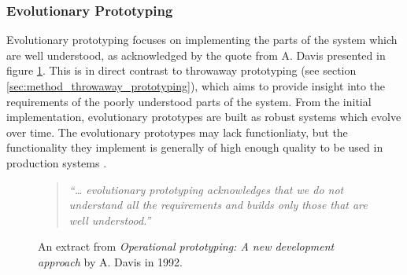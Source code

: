 
\subsubsection{Evolutionary Prototyping}
\label{sec:method_evolutionary_prototyping}

Evolutionary prototyping focuses on implementing the parts of the system which are well understood, as acknowledged by the quote from A. Davis presented in figure \ref{fig:evolutionary_prototyping}. This is in direct contrast to throwaway prototyping (see section \ref{sec:method_throwaway_prototyping}), which aims to provide insight into the requirements of the poorly understood parts of the system. From the initial implementation, evolutionary prototypes are built as robust systems which evolve over time. The evolutionary prototypes may lack functionliaty, but the functionality they implement is generally of high enough quality to be used in production systems \cite{operational_prototyping}.

\begin{figure}[htbp]
	\begin{quote}
		\textit{``… evolutionary prototyping acknowledges that we do not understand all the requirements and builds only those that are well understood.''} \cite{operational_prototyping}
	\end{quote}
	\caption{An extract from \textit{Operational prototyping: A new development approach} by A. Davis in 1992.}
	\label{fig:evolutionary_prototyping}
\end{figure}
